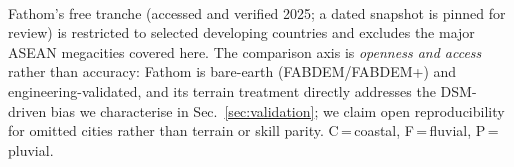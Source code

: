 \documentclass[conference]{IEEEtran}
\begin{document}
\begin{table}[t]
\centering
\caption{Comparator landscape for ASEAN-relevant flood-screening tools.}
\label{tab:landscape}
\small
\setlength{\tabcolsep}{4pt}

\vspace{2pt}
\footnotesize
\textsuperscript{\dag}Fathom's free tranche (accessed and verified 2025; a dated snapshot is pinned for review) is restricted to selected developing countries and excludes the major ASEAN megacities covered here. The comparison axis is \emph{openness and access} rather than accuracy: Fathom is bare-earth (FABDEM/FABDEM+) and engineering-validated, and its terrain treatment directly addresses the DSM-driven bias we characterise in Sec.~\ref{sec:validation}; we claim open reproducibility for omitted cities rather than terrain or skill parity. C\,=\,coastal, F\,=\,fluvial, P\,=\,pluvial.
\end{table}
\end{document}
